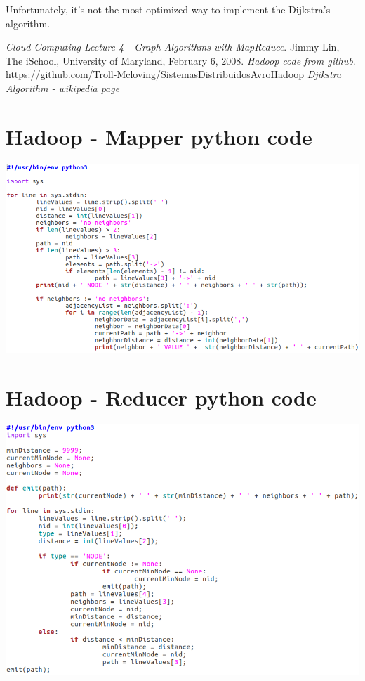 \documentclass[english]{article}
\begin{document}
Unfortunately, it’s not the most optimized way to implement the Dijkstra’s algorithm.


\newpage
\begin{thebibliography}{9}
 \textit{Cloud Computing Lecture 4 - Graph Algorithms with MapReduce}. Jimmy Lin, The iSchool, University of Maryland, February 6, 2008.
 \textit{Hadoop code from github}. \href{https://github.com/Troll-Mcloving/SistemasDistribuidosAvroHadoop}{https://github.com/Troll-Mcloving/SistemasDistribuidosAvroHadoop}
 \textit{Djikstra Algorithm - wikipedia page}
\end{thebibliography}
\newpage
\appendix
\section{Hadoop - Mapper python code}
\includegraphics[scale=0.7]{img/hadoop-mapper.png}
\newpage
\section{Hadoop - Reducer python code}
\includegraphics[scale=0.7]{img/hadoop-reducer.png}
\newpage
\end{document}
